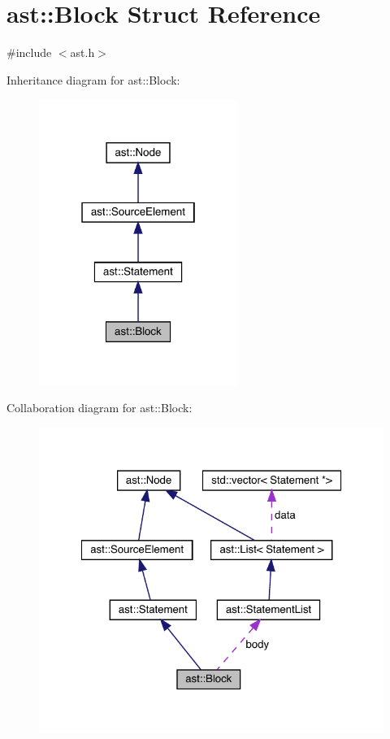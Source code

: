 \hypertarget{structast_1_1_block}{}\section{ast\+:\+:Block Struct Reference}
\label{structast_1_1_block}


{\ttfamily \#include $<$ast.\+h$>$}



Inheritance diagram for ast\+:\+:Block\+:\nopagebreak
\begin{figure}[H]
\begin{center}
\leavevmode
\includegraphics[width=183pt]{structast_1_1_block__inherit__graph}
\end{center}
\end{figure}


Collaboration diagram for ast\+:\+:Block\+:\nopagebreak
\begin{figure}[H]
\begin{center}
\leavevmode
\includegraphics[width=322pt]{structast_1_1_block__coll__graph}
\end{center}
\end{figure}
